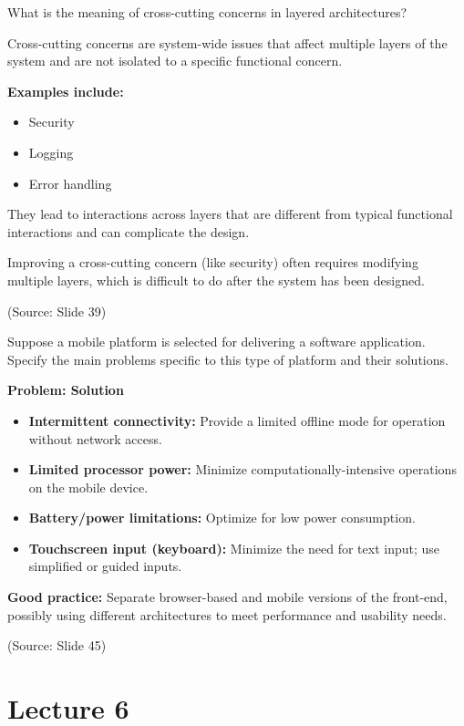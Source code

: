 \documentclass[12pt]{article}
\begin{document}
\begin{questionbox}
What is the meaning of cross-cutting concerns in layered architectures?
\end{questionbox}

Cross-cutting concerns are system-wide issues that affect multiple layers of the system and are not isolated to a specific functional concern.

\textbf{Examples include:}
\begin{itemize}
    \item Security
    \item Logging
    \item Error handling
\end{itemize}

They lead to interactions across layers that are different from typical functional interactions and can complicate the design.

Improving a cross-cutting concern (like security) often requires modifying multiple layers, which is difficult to do after the system has been designed.

(Source: Slide 39)

\begin{questionbox}
Suppose a mobile platform is selected for delivering a software application. Specify the main problems specific to this type of platform and their solutions.
\end{questionbox}

\textbf{Problem: Solution}
\begin{itemize}
    \item \textbf{Intermittent connectivity:} Provide a limited offline mode for operation without network access.
    \item \textbf{Limited processor power:} Minimize computationally-intensive operations on the mobile device.
    \item \textbf{Battery/power limitations:} Optimize for low power consumption.
    \item \textbf{Touchscreen input (keyboard):} Minimize the need for text input; use simplified or guided inputs.
\end{itemize}

\textbf{Good practice:} Separate browser-based and mobile versions of the front-end, possibly using different architectures to meet performance and usability needs.

(Source: Slide 45)

\newpage
\section{Lecture 6}
\end{document}
